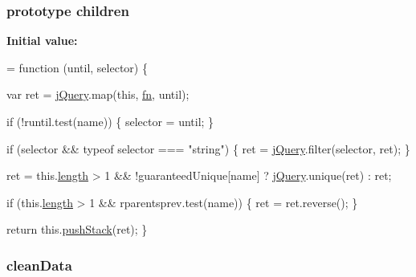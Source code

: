 \subsubsection[{\texorpdfstring{children}{children}}]{ {\bf prototype} children}\hypertarget{jquery-2_82_81-vsdoc_8js_a8f481f41dc3f2af7fcadd06c7fba0815}{}\label{jquery-2_82_81-vsdoc_8js_a8f481f41dc3f2af7fcadd06c7fba0815}
{\bfseries Initial value\+:}
\begin{DoxyCode}
= \textcolor{keyword}{function} (until, selector) \{
        

        var ret = \hyperlink{jquery-2_82_81-vsdoc_8js_add5237586d970a38a81f990e8eb28c6c}{jQuery}.map(\textcolor{keyword}{this}, \hyperlink{jquery-2_82_81-vsdoc_8js_acef6bdaf6b9b20fdcca1ea86f0902c3b}{fn}, until);

        \textcolor{keywordflow}{if} (!runtil.test(name)) \{
            selector = until;
        \}

        \textcolor{keywordflow}{if} (selector && typeof selector === \textcolor{stringliteral}{"string"}) \{
            ret = \hyperlink{jquery-2_82_81-vsdoc_8js_add5237586d970a38a81f990e8eb28c6c}{jQuery}.filter(selector, ret);
        \}

        ret = this.\hyperlink{jquery-2_82_81-vsdoc_8js_aa7de35d58da66d9944ab9cbe82c19640}{length} > 1 && !guaranteedUnique[name] ? \hyperlink{jquery-2_82_81-vsdoc_8js_add5237586d970a38a81f990e8eb28c6c}{jQuery}.unique(ret) : ret;

        \textcolor{keywordflow}{if} (this.\hyperlink{jquery-2_82_81-vsdoc_8js_aa7de35d58da66d9944ab9cbe82c19640}{length} > 1 && rparentsprev.test(name)) \{
            ret = ret.reverse();
        \}

        \textcolor{keywordflow}{return} this.\hyperlink{jquery-2_82_81-vsdoc_8js_afc3a7db1ef2b526338c06c07cecccd44}{pushStack}(ret);
    \}
\end{DoxyCode}
\subsubsection[{\texorpdfstring{clean\+Data}{cleanData}}]{ clean\+Data}\hypertarget{jquery-2_82_81-vsdoc_8js_a7ff5108ab2f23c4dca4bfec7d8045ede}{}\label{jquery-2_82_81-vsdoc_8js_a7ff5108ab2f23c4dca4bfec7d8045ede}
